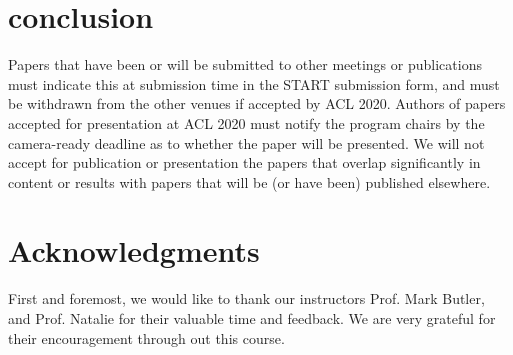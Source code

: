 \documentclass[11pt,a4paper]{article}
\begin{document}
\section{conclusion}
Papers that have been or will be submitted to other meetings or publications must indicate this at submission time in the START submission form, and must be withdrawn from the other venues if accepted by ACL 2020. Authors of papers accepted for presentation at ACL 2020 must notify the program chairs by the camera-ready deadline as to whether the paper will be presented. We will not accept for publication or presentation the papers that overlap significantly in content or results with papers that will be (or have been) published elsewhere.



\section*{Acknowledgments}

First and foremost, we would like to thank our instructors Prof. Mark Butler, and Prof. Natalie for their valuable time and feedback. We are very grateful for their encouragement through out this course.

%
%
\end{document}
